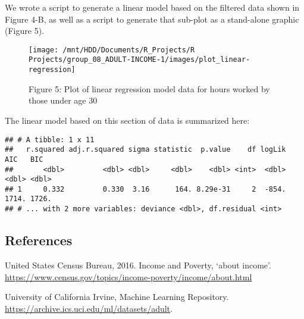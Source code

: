 \documentclass[]{article}
\begin{document}
We wrote a script to generate a linear model based on the filtered data
shown in Figure 4-B, as well as a script to generate that sub-plot as a
stand-alone graphic (Figure 5).

\begin{figure}

{\centering \texttt{[image: /mnt/HDD/Documents/R\_Projects/R Projects/group\_08\_ADULT-INCOME-1/images/plot\_linear-regression]} 

}

\caption{Figure 5: Plot of linear regression model data for hours worked by those under age 30}\label{fig:linear-regression-plot}
\end{figure}

The linear model based on this section of data is summarized here:

\begin{verbatim}
## # A tibble: 1 x 11
##   r.squared adj.r.squared sigma statistic  p.value    df logLik   AIC   BIC
##       <dbl>         <dbl> <dbl>     <dbl>    <dbl> <int>  <dbl> <dbl> <dbl>
## 1     0.332         0.330  3.16      164. 8.29e-31     2  -854. 1714. 1726.
## # ... with 2 more variables: deviance <dbl>, df.residual <int>
\end{verbatim}

\hypertarget{references}{%
\subsection{References}\label{references}}

United States Census Bureau, 2016. Income and Poverty, `about income'.
\url{https://www.census.gov/topics/income-poverty/income/about.html}

University of California Irvine, Machine Learning Repository.
\url{https://archive.ics.uci.edu/ml/datasets/adult}.
\end{document}
